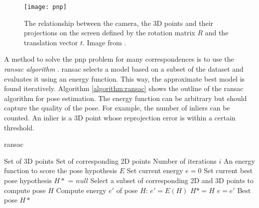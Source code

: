 \begin{figure}[!tbp]
	\centering
    \texttt{[image: pnp]}
    \caption{The relationship between the camera, the 3D points and their projections on the screen defined by the rotation matrix $R$ and the translation vector $t$. Image from \cite{opencv_pnp}.}
    	\label{fig:pnp}
\end{figure} 

A method to solve the \ac{pnp} problem for many correspondences is to use the \textit{\ac{ransac} algorithm} \cite{ransac}. \ac{ransac} selects a model based on a subset of the dataset and evaluates it using an energy function. This way, the approximate best model is found iteratively. Algorithm \ref{algorithm:ransac} shows the outline of the \ac{ransac} algorithm for pose estimation. The energy function can be arbitrary but should capture the quality of the pose. For example, the number of inliers can be counted. An inlier is a 3D point whose reprojection error is within a certain threshold.

\begin{algorithm}
\caption{\ac{ransac}} \label{algorithm:ransac}
\begin{algorithmic} 
\REQUIRE Set of 3D points
\REQUIRE Set of corresponding 2D points
\REQUIRE Number of iterations $i$
\REQUIRE An energy function to score the pose hypothesis $E$
\STATE Set current energy $e=0$
\STATE Set current best pose hypothesis $H*$ = $null$
\STATE Select a subset of corresponding 2D and 3D points to compute pose $H$
\STATE Compute energy $e'$ of pose $H$: $e'=E(H)$
\STATE $H* = H$
\STATE $e = e'$
\ENDIF
\ENDFOR
\RETURN Best pose $H*$
\end{algorithmic}
\end{algorithm}